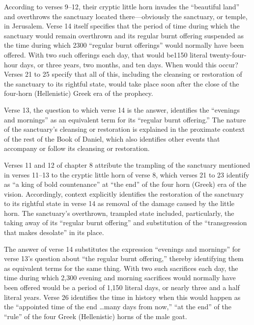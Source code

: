 According to verses 9--12, their cryptic little horn invades the ``beautiful
land'' and overthrows the sanctuary located there---obviously the sanctuary,
or temple, in Jerusalem. Verse 14 itself specifies that the period of time
during which the sanctuary would remain overthrown and its regular burnt
offering suspended as the time during which 2300 ``regular burnt offerings''
would normally have been offered. With two such offerings each day, that
would be1150 literal twenty-four-hour days, or three years, two months, and
ten days. When would this occur? Verses 21 to 25 specify that all of this,
including the cleansing or restoration of the sanctuary to its rightful
state, would take place soon after the close of the four-horn (Hellenistic)
Greek era of the prophecy.

Verse 13, the question to which verse 14 is the answer, identifies the
``evenings and mornings'' as an equivalent term for its ``regular burnt
offering.'' The nature of the sanctuary's cleansing or restoration is
explained in the proximate context of the rest of the Book of Daniel, which
also identifies other events that accompany or follow its cleansing or
restoration.

Verses 11 and 12 of chapter 8 attribute the trampling of the sanctuary
mentioned in verses 11--13 to the cryptic little horn of verse 8, which
verses 21 to 23 identify as ``a king of bold countenance'' at ``the end'' of the
four horn (Greek) era of the vision. Accordingly, context explicitly
identifies the restoration of the sanctuary to its rightful state in verse
14 as removal of the damage caused by the little horn. The sanctuary's
overthrown, trampled state included, particularly, the taking away of its
``regular burnt offering'' and substitution of the ``transgression that makes
desolate'' in its place.

The answer of verse 14 substitutes the expression ``evenings and mornings''
for verse 13's question about ``the regular burnt offering,'' thereby
identifying them as equivalent terms for the same thing. With two such
sacrifices each day, the time during which 2,300 evening and morning
sacrifices would normally have been offered would be a period of 1,150
literal days, or nearly three and a half literal years. Verse 26 identifies
the time in history when this would happen as the ``appointed time of the end
\ldots many days from now,'' ``at the end'' of the ``rule'' of the four Greek
(Hellenistic) horns of the male goat.

